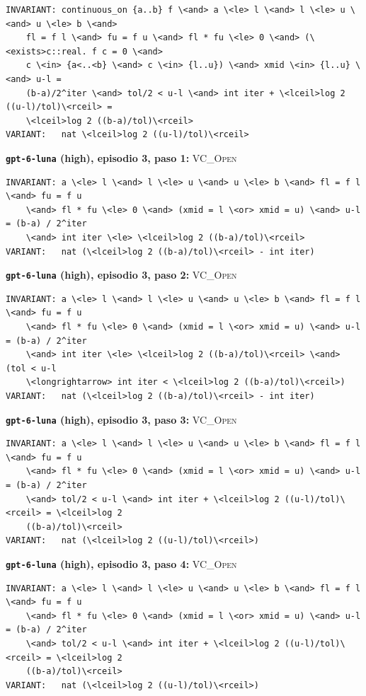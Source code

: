 \begin{lstlisting}
INVARIANT: continuous_on {a..b} f \<and> a \<le> l \<and> l \<le> u \<and> u \<le> b \<and>
    fl = f l \<and> fu = f u \<and> fl * fu \<le> 0 \<and> (\<exists>c::real. f c = 0 \<and>
    c \<in> {a<..<b} \<and> c \<in> {l..u}) \<and> xmid \<in> {l..u} \<and> u-l =
    (b-a)/2^iter \<and> tol/2 < u-l \<and> int iter + \<lceil>log 2 ((u-l)/tol)\<rceil> =
    \<lceil>log 2 ((b-a)/tol)\<rceil>
VARIANT:   nat \<lceil>log 2 ((u-l)/tol)\<rceil>
\end{lstlisting}
\par\medskip\noindent\textbf{\texttt{gpt-6-luna} (high), episodio 3, paso 1:} \textsc{VC\_Open}\par\nopagebreak
\begin{lstlisting}
INVARIANT: a \<le> l \<and> l \<le> u \<and> u \<le> b \<and> fl = f l \<and> fu = f u
    \<and> fl * fu \<le> 0 \<and> (xmid = l \<or> xmid = u) \<and> u-l = (b-a) / 2^iter
    \<and> int iter \<le> \<lceil>log 2 ((b-a)/tol)\<rceil>
VARIANT:   nat (\<lceil>log 2 ((b-a)/tol)\<rceil> - int iter)
\end{lstlisting}
\par\medskip\noindent\textbf{\texttt{gpt-6-luna} (high), episodio 3, paso 2:} \textsc{VC\_Open}\par\nopagebreak
\begin{lstlisting}
INVARIANT: a \<le> l \<and> l \<le> u \<and> u \<le> b \<and> fl = f l \<and> fu = f u
    \<and> fl * fu \<le> 0 \<and> (xmid = l \<or> xmid = u) \<and> u-l = (b-a) / 2^iter
    \<and> int iter \<le> \<lceil>log 2 ((b-a)/tol)\<rceil> \<and> (tol < u-l
    \<longrightarrow> int iter < \<lceil>log 2 ((b-a)/tol)\<rceil>)
VARIANT:   nat (\<lceil>log 2 ((b-a)/tol)\<rceil> - int iter)
\end{lstlisting}
\par\medskip\noindent\textbf{\texttt{gpt-6-luna} (high), episodio 3, paso 3:} \textsc{VC\_Open}\par\nopagebreak
\begin{lstlisting}
INVARIANT: a \<le> l \<and> l \<le> u \<and> u \<le> b \<and> fl = f l \<and> fu = f u
    \<and> fl * fu \<le> 0 \<and> (xmid = l \<or> xmid = u) \<and> u-l = (b-a) / 2^iter
    \<and> tol/2 < u-l \<and> int iter + \<lceil>log 2 ((u-l)/tol)\<rceil> = \<lceil>log 2
    ((b-a)/tol)\<rceil>
VARIANT:   nat (\<lceil>log 2 ((u-l)/tol)\<rceil>)
\end{lstlisting}
\par\medskip\noindent\textbf{\texttt{gpt-6-luna} (high), episodio 3, paso 4:} \textsc{VC\_Open}\par\nopagebreak
\begin{lstlisting}
INVARIANT: a \<le> l \<and> l \<le> u \<and> u \<le> b \<and> fl = f l \<and> fu = f u
    \<and> fl * fu \<le> 0 \<and> (xmid = l \<or> xmid = u) \<and> u-l = (b-a) / 2^iter
    \<and> tol/2 < u-l \<and> int iter + \<lceil>log 2 ((u-l)/tol)\<rceil> = \<lceil>log 2
    ((b-a)/tol)\<rceil>
VARIANT:   nat (\<lceil>log 2 ((u-l)/tol)\<rceil>)
\end{lstlisting}
